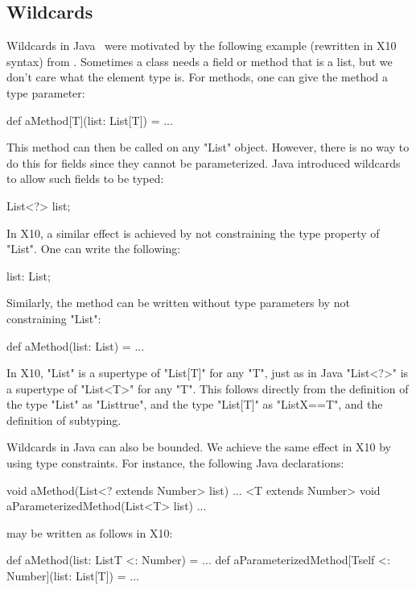 \documentclass[nocopyrightspace,9pt]{sigplanconf}
\begin{document}
\subsection{Wildcards}

Wildcards in Java~\cite{Java3,adding-wildcards} were motivated
by the following example (rewritten in X10 syntax)
from \cite{adding-wildcards}.
Sometimes a class needs a field or method
that is a list, but we don't care what the element type is.
For methods, one can give the method a type parameter:
\begin{xten}
def aMethod[T](list: List[T]) = { ... }
\end{xten}
This method can then be called on any \xcd"List" object.
However, there is no way to do this for fields since they
cannot be parameterized.
Java introduced wildcards to allow such fields to be 
typed:
\begin{xten}
List<?> list;
\end{xten}
In X10, a similar effect is achieved by not constraining the
type property of \xcd"List".
One can write the following:
\begin{xten}
list: List;
\end{xten}
Similarly, the method can be written without type parameters by
not constraining \xcd"List":
\begin{xten}
def aMethod(list: List) = { ... }
\end{xten}

In X10, \xcd"List"
is a supertype of
\xcd"List[T]" for any \xcd"T",
just as in Java
\xcd"List<?>" is a supertype of
\xcd"List<T>" for any \xcd"T".
This follows directly from the definition of the type \xcd"List"
as \xcd"List{true}", and the type \xcd"List[T]"
as \xcd"List{X==T}", and the definition of subtyping.

Wildcards in Java can also be bounded.
We achieve the same
effect in X10 by using type constraints.
For instance, the following Java declarations:
\begin{xten}
void aMethod(List<? extends Number> list) { ... }
<T extends Number> void aParameterizedMethod(List<T> list) { ... }
\end{xten}
may be written as follows in X10:
\begin{xten}
def aMethod(list: List{T <: Number}) = { ... }
def aParameterizedMethod[T{self <: Number}](list: List[T]) = { ... }
\end{xten}
\end{document}
